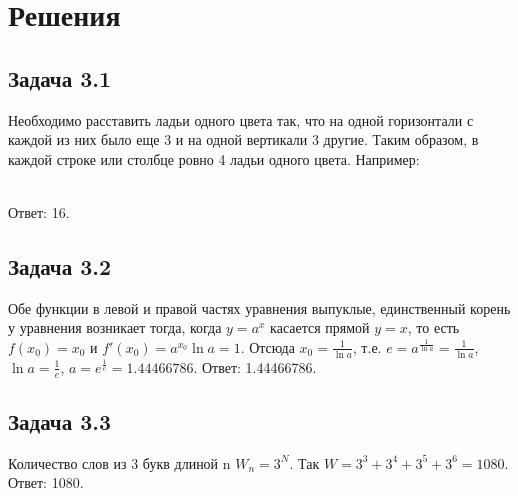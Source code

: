 \documentclass[12pt]{article}
\begin{document}
\section*{Решения}

\subsection*{Задача 3.1}
Необходимо расставить ладьи одного цвета так, что на одной горизонтали с каждой из них было еще 3 и на одной вертикали 3 другие. Таким образом, в каждой строке или столбце ровно 4 ладьи одного цвета. Например:\\
\newgame
 
\showboard\\
Ответ: 16.

\subsection*{Задача 3.2}
Обе функции в левой и правой частях уравнения выпуклые, единственный корень у уравнения возникает тогда, когда $y = a^x$ касается прямой $y = x$, то есть $f(x_0) = x_0$ и $f'(x_0) = a^{x_0} \ln a = 1$. Отсюда $x_0 = \frac{1}{\ln a}$, т.е. $e = a^{\frac{1}{\ln a}} = \frac{1}{\ln a}$, $\ln a = \frac{1}{e}$, $a = e^{\frac{1}{e}} = 1.44466786$.
Ответ: 1.44466786.
\subsection*{Задача 3.3}
Количество слов из 3 букв длиной n $W_n = 3^N$. Так $W = 3^3 + 3^4 + 3^5 + 3^6 = 1080$.
Ответ: 1080.
\end{document}
